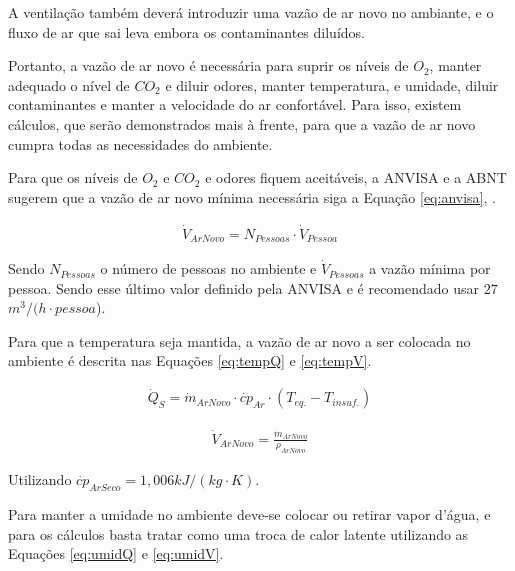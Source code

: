 \documentclass[acronym,symbols,table]{fei}
\begin{document}
A ventilação também deverá introduzir uma vazão de ar novo no ambiante, e o fluxo de ar que sai leva embora os contaminantes diluídos. 

Portanto, a  vazão de ar novo é necessária para suprir os níveis de ${O}_{2}$, manter adequado o nível de ${CO}_{2}$ e diluir odores, manter temperatura, e umidade, diluir contaminantes e manter a velocidade do ar confortável. Para isso, existem cálculos, que serão demonstrados mais à frente, para que a vazão de ar novo cumpra todas as necessidades do ambiente.

Para que os níveis de ${O}_{2}$ e ${CO}_{2}$ e odores fiquem aceitáveis, a ANVISA e a ABNT sugerem que a vazão de ar novo mínima necessária siga a Equação \ref{eq:anvisa}, \cite{abnt216401}.

\begin{equation} \label{eq:anvisa}
\begin{aligned}
    \dot{V}_{ArNovo}=N_{Pessoas}\cdot {\dot{V}_{Pessoa}}
\end{aligned}
\end{equation}

Sendo $N_{Pessoas}$ o número de pessoas no ambiente e $\dot{V}_{Pessoas}$ a vazão mínima por pessoa. Sendo esse último valor definido pela ANVISA e é recomendado usar $27$ $m^3/(h\cdot{pessoa}$).

Para que a temperatura seja mantida, a vazão de ar novo a ser colocada no ambiente é descrita nas Equações \ref{eq:tempQ} e \ref{eq:tempV}.

\begin{equation} \label{eq:tempQ}
\begin{aligned}
    \dot{Q}_{S}=\dot{m}_{ArNovo}\cdot {\dot{cp}_{Ar}}\cdot({T_{eq.}-T_{insuf.}})
\end{aligned}
\end{equation}

\begin{equation} \label{eq:tempV}
\begin{aligned}
    \dot{V}_{ArNovo}=\frac{\dot{m}_{ArNovo}}{\rho_{ArNovo}}
\end{aligned}
\end{equation}

Utilizando $\dot{cp}_{ArSeco}=1,006 kJ/(kg\cdot{K})$.

Para manter a umidade no ambiente deve-se colocar ou retirar vapor d'água, e para os cálculos basta tratar como uma troca de calor latente utilizando as Equações \ref{eq:umidQ} e \ref{eq:umidV}.
\end{document}
